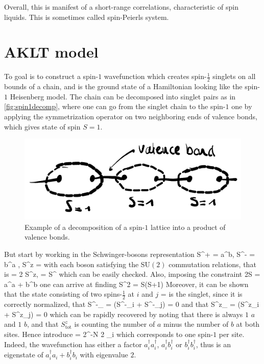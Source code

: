 		Overall, this is manifest of a short-range correlations, characteristic of spin liquids. This is sometimes called spin-Peierls system.

	\section{AKLT model}

		To goal is to construct a spin-$1$ wavefunction which creates spin-$\frac 1 2$ singlets on all bounds of a chain, and is the ground state of a Hamiltonian looking like the spin-$1$ Heisenberg model. The chain can be decomposed into singlet pairs as in \autoref{fig:spin1decomp}, where one can go from the singlet chain to the spin-$1$ one by applying the symmetrization operator on two neighboring ends of valence bonds, which gives state of spin $S=1$.
		\begin{figure}[h!]
            \centering
            \includegraphics[scale=0.2]{graphs/spin1decomp.png}
            \caption{Example of a decomposition of a spin-$1$ lattice into a product of valence bonds.}
            \label{fig:spin1decomp}
        \end{figure}
        But start by working in the Schwinger-bosons representation
		\be S^+ = a^\dagger b, \quad S^- = b^\dagger a , \quad S^z =   \ee
		with each boson satisfying the SU$(2)$ commutation relations, that is
		\be [ S^+, S^-] = 2 S^z, \quad [ S^\pm, S^z] = \pm  S^\pm \ee
		which can be easily checked. Also, imposing the constraint
		\be 2S = a^\dagger a + b^\dagger b \ee
		one can arrive at finding 
		\be \vb* S^2 = S(S+1) \ee
		Moreover, it can be shown that the state consisting of two spins-$\frac{1}{2}$ at $i$ and $j$
		\be \ket \phi =    \ee
		is the singlet, since it is correctly normalized, that 
		\be S^-_ \ket \phi = (S^-_i + S^-_j) \ket \phi = 0 \ee
		and that
		\be S^z_ \ket \phi = (S^z_i + S^z_j) \ket \phi = 0 \ee
		which can be rapidly recovered by noting that there is always $1$ $a$ and $1$ $b$, and that $S^z_\text{tot}$ is counting the number of $a$ minus the number of $b$ at both sites. Hence introduce
		\be {} = 2^{-\frac N 2} \prod_i   \ee
		which corresponds to one spin-$1$ per site. Indeed, the wavefunction has either a factor $a^\dagger_i a^\dagger_i$, $a^\dagger_i b^\dagger_i$ or $b^\dagger_i b^\dagger_i$, thus is an eigenstate of $a^\dagger_i a_i + b^\dagger_i b_i$ with eigenvalue $2$.

